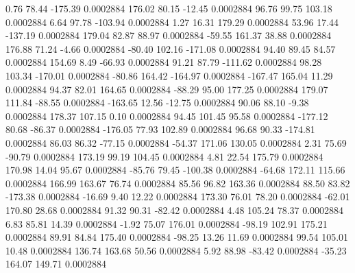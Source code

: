         0.76       78.44     -175.39     0.0002884
      176.02       80.15      -12.45     0.0002884
       96.76       99.75      103.18     0.0002884
        6.64       97.78     -103.94     0.0002884
        1.27       16.31      179.29     0.0002884
       53.96       17.44     -137.19     0.0002884
      179.04       82.87       88.97     0.0002884
      -59.55      161.37       38.88     0.0002884
      176.88       71.24       -4.66     0.0002884
      -80.40      102.16     -171.08     0.0002884
       94.40       89.45       84.57     0.0002884
      154.69        8.49      -66.93     0.0002884
       91.21       87.79     -111.62     0.0002884
       98.28      103.34     -170.01     0.0002884
      -80.86      164.42     -164.97     0.0002884
     -167.47      165.04       11.29     0.0002884
       94.37       82.01      164.65     0.0002884
      -88.29       95.00      177.25     0.0002884
      179.07      111.84      -88.55     0.0002884
     -163.65       12.56      -12.75     0.0002884
       90.06       88.10       -9.38     0.0002884
      178.37      107.15        0.10     0.0002884
       94.45      101.45       95.58     0.0002884
     -177.12       80.68      -86.37     0.0002884
     -176.05       77.93      102.89     0.0002884
       96.68       90.33     -174.81     0.0002884
       86.03       86.32      -77.15     0.0002884
      -54.37      171.06      130.05     0.0002884
        2.31       75.69      -90.79     0.0002884
      173.19       99.19      104.45     0.0002884
        4.81       22.54      175.79     0.0002884
      170.98       14.04       95.67     0.0002884
      -85.76       79.45     -100.38     0.0002884
      -64.68      172.11      115.66     0.0002884
      166.99      163.67       76.74     0.0002884
       85.56       96.82      163.36     0.0002884
       88.50       83.82     -173.38     0.0002884
      -16.69        9.40       12.22     0.0002884
      173.30       76.01       78.20     0.0002884
      -62.01      170.80       28.68     0.0002884
       91.32       90.31      -82.42     0.0002884
        4.48      105.24       78.37     0.0002884
        6.83       85.81       14.39     0.0002884
       -1.92       75.07      176.01     0.0002884
      -98.19      102.91      175.21     0.0002884
       89.91       84.84      175.40     0.0002884
      -98.25       13.26       11.69     0.0002884
       99.54      105.01       10.48     0.0002884
      136.74      163.68       50.56     0.0002884
        5.92       88.98      -83.42     0.0002884
      -35.23      164.07      149.71     0.0002884
